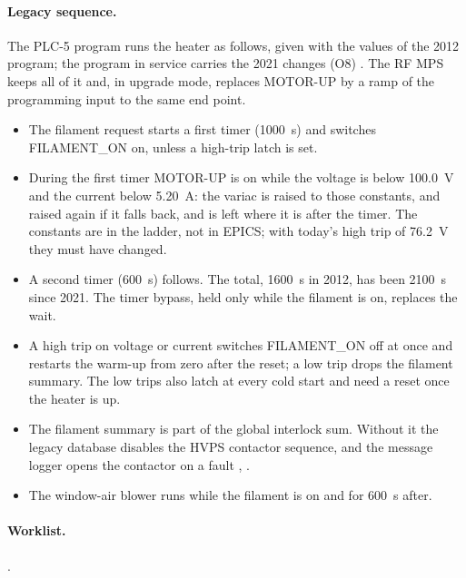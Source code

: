 \paragraph{Legacy sequence.} The PLC-5 program runs the heater as follows, given with
the values of the 2012 program; the program in service carries the 2021 changes (O8)
. The RF MPS keeps all of it and, in upgrade mode, replaces MOTOR-UP by a ramp of
the programming input to the same end point.
\begin{itemize}
\item The filament request starts a first timer (\qty{1000}{\second}) and switches
FILAMENT\_ON on, unless a high-trip latch is set.
\item During the first timer MOTOR-UP is on while the voltage is below
\qty{100.0}{\volt} and the current below \qty{5.20}{\ampere}: the variac is raised to
those constants, and raised again if it falls back, and is left where it is after the
timer. The constants are in the ladder, not in EPICS; with today's high trip of
\qty{76.2}{\volt} they must have changed.
\item A second timer (\qty{600}{\second}) follows. The total, \qty{1600}{\second} in
2012, has been \qty{2100}{\second} since 2021. The timer bypass, held only while the
filament is on, replaces the wait.
\item A high trip on voltage or current switches FILAMENT\_ON off at once and restarts
the warm-up from zero after the reset; a low trip drops the filament summary. The low
trips also latch at every cold start and need a reset once the heater is up.
\item The filament summary is part of the global interlock sum. Without it the legacy
database disables the HVPS contactor sequence, and the message logger opens the
contactor on a fault , .
\item The window-air blower runs while the filament is on and for \qty{600}{\second}
after.
\end{itemize}

\paragraph{Worklist.} .

